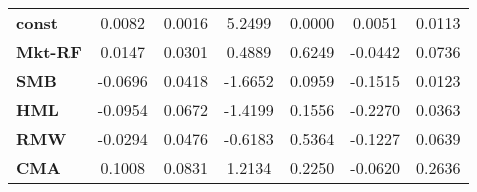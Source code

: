 \begin{center}
\begin{tabular}{lcccccc}
\midrule
\textbf{const}  &       0.0082       &       0.0016       &      5.2499     &      0.0000      &       0.0051      &       0.0113       \\
\textbf{Mkt-RF} &       0.0147       &       0.0301       &      0.4889     &      0.6249      &      -0.0442      &       0.0736       \\
\textbf{SMB}    &      -0.0696       &       0.0418       &     -1.6652     &      0.0959      &      -0.1515      &       0.0123       \\
\textbf{HML}    &      -0.0954       &       0.0672       &     -1.4199     &      0.1556      &      -0.2270      &       0.0363       \\
\textbf{RMW}    &      -0.0294       &       0.0476       &     -0.6183     &      0.5364      &      -0.1227      &       0.0639       \\
\textbf{CMA}    &       0.1008       &       0.0831       &      1.2134     &      0.2250      &      -0.0620      &       0.2636       \\
\bottomrule
\end{tabular}
\end{center}

